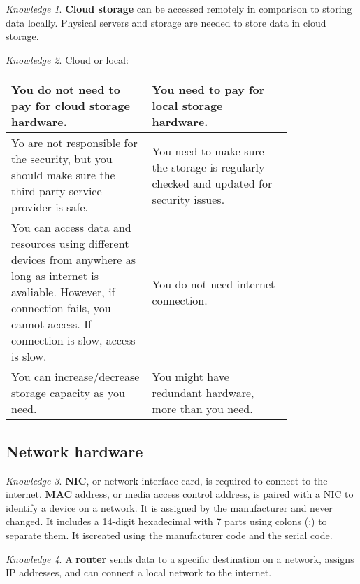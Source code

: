 \documentclass[8pt]{article}
\theoremstyle{remark}
\newtheorem{knowledge}{Knowledge}[subsection]
\begin{document}
            \begin{knowledge}
                \textbf{Cloud storage} can be accessed remotely in comparison to storing data locally. Physical servers and storage are needed to store data in cloud storage.
            \end{knowledge}

            \begin{knowledge}
                Cloud or local:
                \begin{center}
                    \begin{tabular}{p{0.4\linewidth}|p{0.4\linewidth}}
                        You do not need to pay for cloud storage hardware. & You need to pay for local storage hardware.\\\hline
                        Yo are not responsible for the security, but you should make sure the third-party service provider is safe. & You need to make sure the storage is regularly checked and updated for security issues.\\\hline
                        You can access data and resources using different devices from anywhere as long as internet is avaliable. However, if connection fails, you cannot access. If connection is slow, access is slow. & You do not need internet connection.\\\hline
                        You can increase/decrease storage capacity as you need. & You might have redundant hardware, more than you need.
                    \end{tabular}
                \end{center}
            \end{knowledge}

        \subsection{Network hardware}
            \begin{knowledge}
                \textbf{NIC}, or network interface card, is required to connect to the internet. \textbf{MAC} address, or media access control address, is paired with a NIC to identify a device on a network. It is assigned by the manufacturer and never changed. It includes a 14-digit hexadecimal with 7 parts using colons (:) to separate them. It iscreated using the manufacturer code and the serial code. 
            \end{knowledge}

            \begin{knowledge}
                A \textbf{router} sends data to a specific destination on a network, assigns IP addresses, and can connect a local network to the
                internet.
            \end{knowledge}
\end{document}
